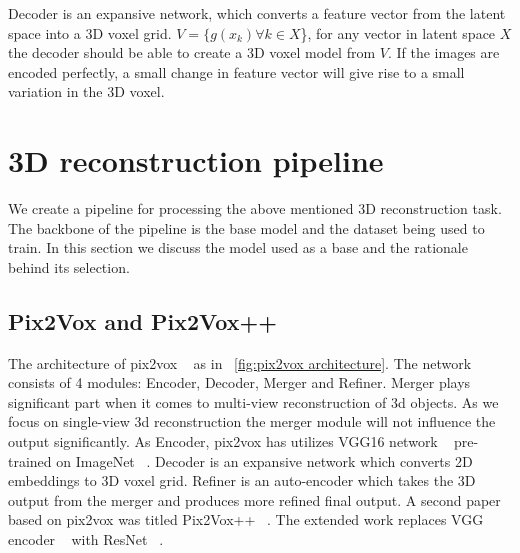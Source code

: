 Decoder is an expansive network, which converts a feature vector from the latent space into a 3D voxel grid.
$V = \{g(x_k) \forall k \in X$\}, for any vector in latent space $X$ the decoder should be able to create a 3D voxel model from $V$.
If the images are encoded perfectly, a small change in feature vector will give rise to a small variation in the 3D voxel.

\section{3D reconstruction pipeline}\label{sec:3D reconstruction pipeline}
We create a pipeline for processing the above mentioned 3D reconstruction task.
The backbone of the pipeline is the base model and the dataset being used to train.
In this section we discuss the model used as a base and the rationale behind its selection.

\subsection{Pix2Vox and Pix2Vox++}\label{subsec:pix2vox-and-pix2vox++}
The architecture of pix2vox ~\cite{Xie_2019} as in ~\ref{fig:pix2vox architecture}.
The network consists of 4 modules: Encoder, Decoder, Merger and Refiner.
Merger plays significant part when it comes to multi-view reconstruction of 3d objects.
As we focus on single-view 3d reconstruction the merger module will not influence the output significantly.
As Encoder, pix2vox has utilizes VGG16 network ~\cite{simonyan2015deep} pre-trained on ImageNet ~\cite{Deng2009ImageNetAL}.
Decoder is an expansive network which converts 2D embeddings to 3D voxel grid.
Refiner is an auto-encoder which takes the 3D output from the merger and produces more refined final output.
A second paper based on pix2vox was titled Pix2Vox++ ~\cite{Xie_2020}.
The extended work replaces VGG encoder ~\cite{simonyan2015deep} with ResNet ~\cite{He2016DeepRL}.

